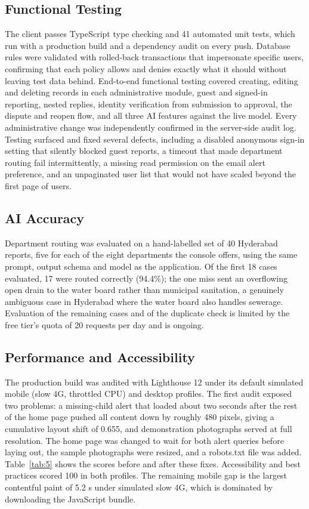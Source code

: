 \documentclass[conference]{IEEEtran}
\begin{document}
\subsection{Functional Testing}
The client passes TypeScript type checking and 41 automated unit tests, which run with a production build and a dependency audit on every push. Database rules were validated with rolled-back transactions that impersonate specific users, confirming that each policy allows and denies exactly what it should without leaving test data behind. End-to-end functional testing covered creating, editing and deleting records in each administrative module, guest and signed-in reporting, nested replies, identity verification from submission to approval, the dispute and reopen flow, and all three AI features against the live model. Every administrative change was independently confirmed in the server-side audit log. Testing surfaced and fixed several defects, including a disabled anonymous sign-in setting that silently blocked guest reports, a timeout that made department routing fail intermittently, a missing read permission on the email alert preference, and an unpaginated user list that would not have scaled beyond the first page of users.

\subsection{AI Accuracy}
Department routing was evaluated on a hand-labelled set of 40 Hyderabad reports, five for each of the eight departments the console offers, using the same prompt, output schema and model as the application. Of the first 18 cases evaluated, 17 were routed correctly (94.4\%); the one miss sent an overflowing open drain to the water board rather than municipal sanitation, a genuinely ambiguous case in Hyderabad where the water board also handles sewerage. Evaluation of the remaining cases and of the duplicate check is limited by the free tier's quota of 20 requests per day \cite{b19} and is ongoing.

\subsection{Performance and Accessibility}
The production build was audited with Lighthouse 12 \cite{b20} under its default simulated mobile (slow 4G, throttled CPU) and desktop profiles. The first audit exposed two problems: a missing-child alert that loaded about two seconds after the rest of the home page pushed all content down by roughly 480 pixels, giving a cumulative layout shift of 0.655, and demonstration photographs served at full resolution. The home page was changed to wait for both alert queries before laying out, the sample photographs were resized, and a robots.txt file was added. Table~\ref{tab:5} shows the scores before and after these fixes. Accessibility and best practices scored 100 in both profiles. The remaining mobile gap is the largest contentful paint of 5.2 s under simulated slow 4G, which is dominated by downloading the JavaScript bundle.
\end{document}
